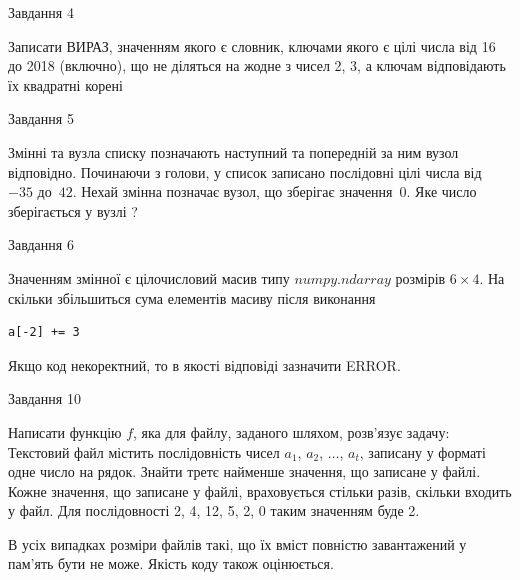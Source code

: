 \documentclass[12pt, ukrainian]{article}
\begin{document}
{               
{\begin{center}Завдання {4}\end{center}}
\vspace{-6mm}
Записати ВИРАЗ, значенням якого є словник, ключами якого є цілі числа від 16 до 2018 (включно), що не діляться на жодне з чисел 2, 3, а ключам відповідають їх квадратні корені\par

\vspace{10mm}
               
{\begin{center}Завдання {5}\end{center}}
\vspace{-6mm}
Змінні  та  вузла списку позначають наступний та попередній за ним вузол відповідно. Починаючи з голови, у список записано послідовні цілі числа від~$-35$ до~$42$. Нехай змінна  позначає вузол, що зберігає значення~$0$.
Яке число зберігається у вузлі  ?\par

               
{\begin{center}Завдання {6}\end{center}}
\vspace{-6mm}
Значенням змінної  є цілочисловий масив типу $numpy.ndarray$ розмірів $6{\times}4$. На скільки збільшиться сума елементів масиву  після виконання
\begin{verbatim}
a[-2] += 3
\end{verbatim}


Якщо код некоректний, то в якості відповіді зазначити ERROR.\par

               
{\begin{center}Завдання {10}\end{center}}
\vspace{-6mm}

Написати функцію $f$, яка для файлу, заданого шляхом, розв’язує задачу:\\ Текстовий файл містить послідовність чисел $a_1$, $a_2$, $\ldots$, $a_t$, записану у форматі одне число на рядок. Знайти третє найменше значення, що записане у файлі. Кожне значення, що записане у файлі, враховується стільки разів, скільки входить у файл. Для послідовності 2, 4, 12, 5, 2, 0 таким значенням буде 2.

В усіх випадках розміри файлів такі, що їх вміст повністю завантажений у пам'ять бути не може. Якість коду також оцінюється.



}
\end{document}
